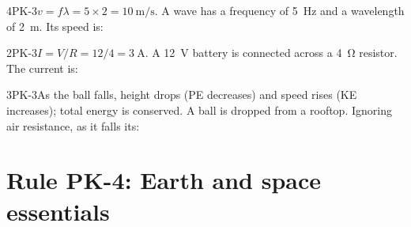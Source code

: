 \documentclass[11pt]{article}
\begin{document}
\begin{q}{4}{PK-3}{$v = f\lambda = 5 \times 2 = \SI{10}{\metre\per\second}$.}
A wave has a frequency of \SI{5}{\hertz} and a wavelength of \SI{2}{\metre}. Its speed is:
\end{q}

\begin{q}{2}{PK-3}{$I = V/R = 12/4 = \SI{3}{\ampere}$.}
A \SI{12}{\volt} battery is connected across a \SI{4}{\ohm} resistor. The current is:
\end{q}

\begin{q}{3}{PK-3}{As the ball falls, height drops (PE decreases) and speed rises (KE increases); total energy is conserved.}
A ball is dropped from a rooftop. Ignoring air resistance, as it falls its:
\end{q}

\section{Rule PK-4: Earth and space essentials}
\end{document}
